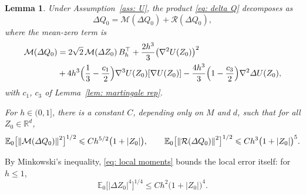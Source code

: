 \documentclass[namedate,webpdf,imanum]{ima-authoring-template}
\newcommand{\Le}{\leqslant}
\theoremstyle{thmstyletwo}
\newtheorem{lemma}{Lemma}
\numberwithin{equation}{section}
\begin{document}
\begin{lemma}
\label{lem: cross moment}
    Under Assumption~\ref{ass: U}, the product \eqref{eq: delta Q} decomposes as
    \begin{equation}
        \Delta Q_0 = \mathcal M(\Delta Q_0) + \mathcal R(\Delta Q_0) ,
        \label{eq: product decomposition}
    \end{equation}
    where the mean-zero term is
    \begin{align}
        \mathcal M(\Delta Q_0) & = 2\sqrt2\, \mathcal M(\Delta Z_0)\, B_h^\top
        + \frac{2h^3}{3} \bigl( \nabla^2 U(Z_0) \bigr)^2 \notag \\
        & + 4h^3 \Bigl( \frac13 - \frac{c_1}{2} \Bigr) \nabla^3 U(Z_0)[\nabla U(Z_0)]
        - \frac{4h^3}{3} \Bigl( 1 - \frac{c_3}{2} \Bigr) \nabla^2 \Delta U(Z_0) ,
    \label{eq: product martingale}
    \end{align}
    with $c_1$, $c_3$ of Lemma~\ref{lem: martingale rep}.
    
    For $h \in (0, 1]$, there is a constant $C$, depending only on $M$ and $d$, such that for all $Z_0 \in \mathbb R^d$,
    \begin{equation}
        \mathbb E_0\bigl[ \norm{\mathcal M(\Delta Q_0)}^2 \bigr]^{1/2} \Le C h^{5/2} \bigl( 1 + |Z_0| \bigr) , \qquad
        \mathbb E_0\bigl[ \norm{\mathcal R(\Delta Q_0)}^2 \bigr]^{1/2} \Le C h^{3} \bigl( 1 + |Z_0| \bigr)^5 .
        \label{eq: cross moment}
    \end{equation}
\end{lemma}

By Minkowski's inequality, \eqref{eq: local moments} bounds the local error itself: for $h \Le 1$,
\begin{equation}
    \mathbb E_0\bigl[ |\Delta Z_0|^4 \bigr]^{1/4} \Le C h^2 \bigl( 1 + |Z_0| \bigr)^4 .
    \label{eq: local error moment}
\end{equation}
\end{document}
